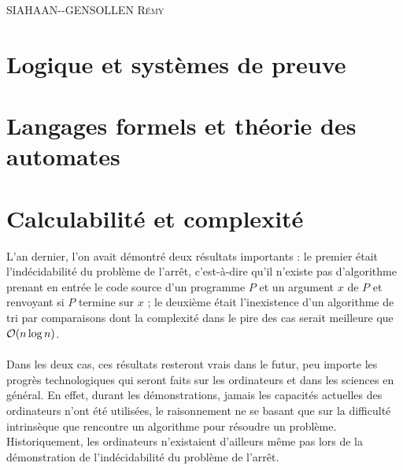 \documentclass[a4paper,french,bookmarks]{book}
\begin{document}
    \hfill{\textsc{SIAHAAN-{}-GENSOLLEN Rémy}}
    
    \pagestyle{intro}
    

    \dominitoc\nomtcrule 
    {\sffamily\tableofcontents}\mtcaddchapter\pagestyle{toc}
    
    
    
    \pagestyle{plain}
    
    \chapter{Logique et systèmes de preuve}
    
    
    \chapter{Langages formels et théorie des automates}
    
    
    \chapter{Calculabilité et complexité}
    
    L'an dernier, l'on avait démontré deux résultats importants : le premier était l'indécidabilité du problème de l'arrêt, c'est-à-dire qu'il n'existe pas d'algorithme prenant en entrée le code source d'un programme $P$ et un argument $x$ de $P$ et renvoyant si $P$ termine sur $x$ ; le deuxième était l'inexistence d'un algorithme de tri par comparaisons dont la complexité dans le pire des cas serait meilleure que $\O{}{n\log n}$.\medskip
    
    Dans les deux cas, ces résultats resteront vrais dans le futur, peu importe les progrès technologiques qui seront faits sur les ordinateurs et dans les sciences en général. En effet, durant les démonstrations, jamais les capacités actuelles des ordinateurs n'ont été utilisées, le raisonnement ne se basant que sur la difficulté intrinsèque que rencontre un algorithme pour résoudre un problème. Historiquement, les ordinateurs n'existaient d'ailleurs même pas lors de la démonstration de l'indécidabilité du problème de l'arrêt.\medskip
    
\end{document}
